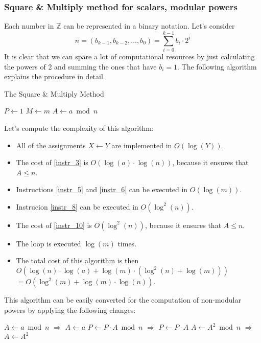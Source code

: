\subsubsection{Square \& Multiply method for scalars, modular powers}
Each number in $\mathbb{Z}$ can be represented in a binary notation. \newline
Let's consider
\[n = (b_{k-1}, b_{k-2}, \dots, b_{0}) = \sum_{i=0}^{k-1} b_{i} \cdot 2^{i}\]
It is clear that we can spare a lot of computational resources by just calculating the powers of 2 and summing the ones that have $b_{i} = 1$. The following algorithm explains the procedure in detail.
\begin{algorithm}
\caption{The Square \& Multiply Method}\label{alg:SquareMultiply}
$P \gets 1$\;
$M \gets m$\;
$A \gets a \bmod n$\;\label{instr_3}
\end{algorithm}
Let's compute the complexity of this algorithm:
\begin{itemize}
    \item All of the assignments $X \gets Y$ are implemented in $O(\operatorname{log}(Y))$.
    \item The cost of \ref{instr_3} is $O(\operatorname{log}(a) \cdot \operatorname{log}(n))$, because it ensures that $A \leq n$.
    \item Instructions \ref{instr_5} and \ref{instr_6} can be executed in $O(\operatorname{log}(m))$.
    \item Instrucion \ref{instr_8} can be executed in $O(\operatorname{log}^{2}(n))$.
    \item The cost of \ref{instr_10} is $O(\operatorname{log}^{2}(n))$, because it ensures that $A \leq n$.
    \item The loop is executed $\operatorname{log}(m)$ times.
    \item The total cost of this algorithm is then $O(\operatorname{log}(n) \cdot \operatorname{log}(a) + \operatorname{log}(m) \cdot (\operatorname{log}^{2}(n) + \operatorname{log}(m)))$ \\ $= O(\operatorname{log}^{2}(m) + \operatorname{log}(m) \cdot \operatorname{log}(n))$.
\end{itemize}
This algorithm can be easily converted for the computation of non-modular powers by applying the following changes:
\begin{algorithm}
    $A \gets a \bmod n$ $\Longrightarrow$ $A \gets a$\;\label{instr_3a}
    $P \gets P \cdot A \bmod n$ $\Longrightarrow$ $P \gets P \cdot A$\;\label{instr_8a}
    $A \gets A^{2} \bmod n$ $\Longrightarrow$ $A \gets A^{2}$\;\label{instr_10a}
\end{algorithm}
